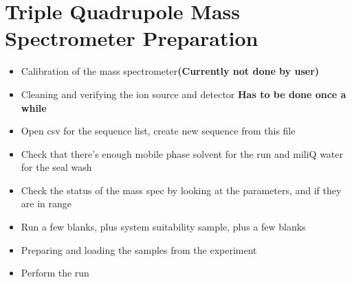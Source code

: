 \documentclass{article}
\newcommand{\bigbox}{\raisebox{\depth}{\scalebox{1.5}{$\square$}}}
\begin{document}
\section{Triple Quadrupole Mass Spectrometer Preparation}
\begin{itemize}
\item[\bigbox] {Calibration of the mass spectrometer\textbf{(Currently not done by user)}}
\item[\bigbox] {Cleaning and verifying the ion source and detector \textbf{Has to be done once a while} }
\item[\bigbox] {Open csv for the sequence list, create new sequence from this file}
\item[\bigbox] {Check that there's enough mobile phase solvent for the run and miliQ water for the seal wash}
\item[\bigbox] {Check the status of the mass spec by looking at the parameters, and if they are in range}

\item[\bigbox] {Run a few blanks, plus system suitability sample, plus a few blanks}
\item[\bigbox] {Preparing and loading the samples from the experiment}
\item[\bigbox] {Perform the run}
\end{itemize}


\end{document}
